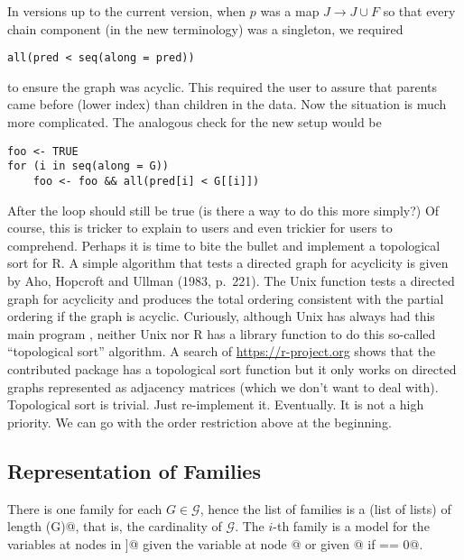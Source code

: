 \documentclass[11pt]{article}
\begin{document}
In versions up to the current version, when $p$ was a map $J \to J \cup F$
so that every chain component (in the new terminology) was a singleton,
we required
\begin{verbatim}
all(pred < seq(along = pred))
\end{verbatim}
to ensure the graph was acyclic.  This required the user to assure
that parents came before (lower index) than children in the data.
Now the situation is much more complicated.  The analogous check for
the new setup would be
\begin{verbatim}
foo <- TRUE
for (i in seq(along = G))
    foo <- foo && all(pred[i] < G[[i]])
\end{verbatim}
After the loop \verb@foo@ should still be true (is there a way to do this
more simply?)  Of course, this is tricker to explain to users and even
trickier for users to comprehend.  Perhaps it is time to bite the bullet
and implement a topological sort for R.
A simple algorithm that tests a directed graph for acyclicity is given
by Aho, Hopcroft and Ullman (1983, p.~221).
The Unix function \verb@tsort@ tests a directed graph for acyclicity
and produces the total ordering consistent with the partial ordering
if the graph is acyclic.  Curiously, although Unix has always had
this main program \verb@tsort@, neither Unix nor R has a library
function to do this so-called ``topological sort'' algorithm.
A search of \url{https://r-project.org} shows that the contributed package
\verb@ggm@ has a topological sort function \verb@topSort@ but it only
works on directed graphs represented as adjacency matrices (which we don't
want to deal with).  Topological sort is trivial.  Just re-implement it.
Eventually.  It is not a high priority.  We can go with the order restriction
above at the beginning.

\subsection{Representation of Families} \label{sec:multi-fam}

There is one family for each $G \in \mathcal{G}$, hence the list of families
is a (list of lists) of length \verb@length(G)@, that is, the cardinality
of $\mathcal{G}$.  The $i$-th family is a model for the variables at nodes
in \verb@G[[i]]@ given the variable at node \verb@pred[i]@ or given
\verb@root[i]@ if \verb@pred[i] == 0@.
\end{document}
